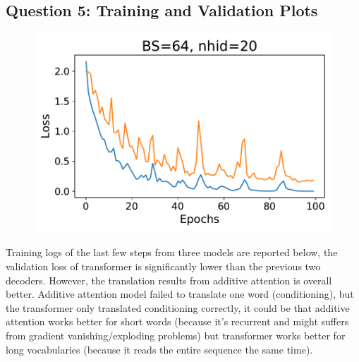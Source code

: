 \documentclass{article}
\begin{document}
\subsection{Question 5: Training and Validation Plots}
\begin{figure}[H]
	\centering
	\includegraphics[width=0.7\linewidth]{./Transformer_loss_plot.pdf}
\end{figure}
\par Training logs of the last few steps from three models are reported below, the validation loss of transformer is significantly lower than the previous two decoders. However, the translation results from additive attention is overall better. Additive attention model failed to translate one word (conditioning), but the transformer only translated conditioning correctly, it could be that additive attention works better for short words (because it's recurrent and might suffers from gradient vanishing/exploding problems) but transformer works better for long vocabularies (because it reads the entire sequence the same time).
\end{document}

